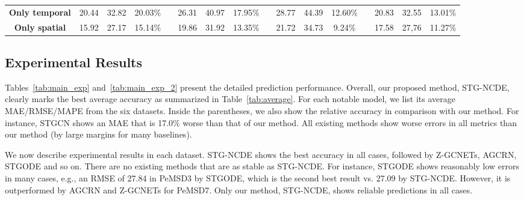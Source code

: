 \documentclass[letterpaper]{article} \usepackage{aaai22}  \usepackage{times}  \usepackage{helvet}  \usepackage{courier}  \usepackage[hyphens]{url}  \usepackage{graphicx} \urlstyle{rm} \def\UrlFont{\rm}  \usepackage{natbib}  \usepackage{caption} \DeclareCaptionStyle{ruled}{labelfont=normalfont,labelsep=colon,strut=off} \frenchspacing  \setlength{\pdfpagewidth}{8.5in}  \setlength{\pdfpageheight}{11in}  \usepackage{stfloats}
\begin{document}
\begin{table*}[t]
\begin{tabular}{c ccc c ccc c ccc c ccc}
        \textbf{Only temporal}  & 20.44 & 32.82 & 20.03\%       && 26.31 & 40.97 & 17.95\%          && 28.77 & 44.39 & 12.60\%         && 20.83 & 32.55 & 13.01\% \\
        \textbf{Only spatial}   & 15.92 & 27.17 & 15.14\%       && 19.86 & 31.92 & 13.35\%          && 21.72 & 34.73 &  9.24\%         && 17.58 & 27,76 & 11.27\% \\
        \hline
    \end{tabular}
    \caption{Forecasting error on PeMSD3, PeMSD4, PeMSD7 and PeMSD8}
    \label{tab:main_exp}
\end{table*}

\subsection{Experimental Results}
Tables~\ref{tab:main_exp} and~\ref{tab:main_exp_2} present the detailed prediction performance. Overall, our proposed method, STG-NCDE, clearly marks the best average accuracy as summarized in Table~\ref{tab:average}. For each notable model, we list its average MAE/RMSE/MAPE from the six datasets. Inside the parentheses, we also show the relative accuracy in comparison with our method. For instance, STGCN shows an MAE that is 17.0\% worse than that of our method. All existing methods show worse errors in all metrics than our method (by large margins for many baselines).

We now describe experimental results in each dataset. STG-NCDE shows the best accuracy in all cases, followed by Z-GCNETs, AGCRN, STGODE and so on. There are no existing methods that are as stable as STG-NCDE. For instance, STGODE shows reasonably low errors in many cases, e.g., an RMSE of 27.84 in PeMSD3 by STGODE, which is the second best result vs. 27.09 by STG-NCDE. However, it is outperformed by AGCRN and Z-GCNETs for PeMSD7. Only our method, STG-NCDE, shows reliable predictions in all cases. 
\end{document}

